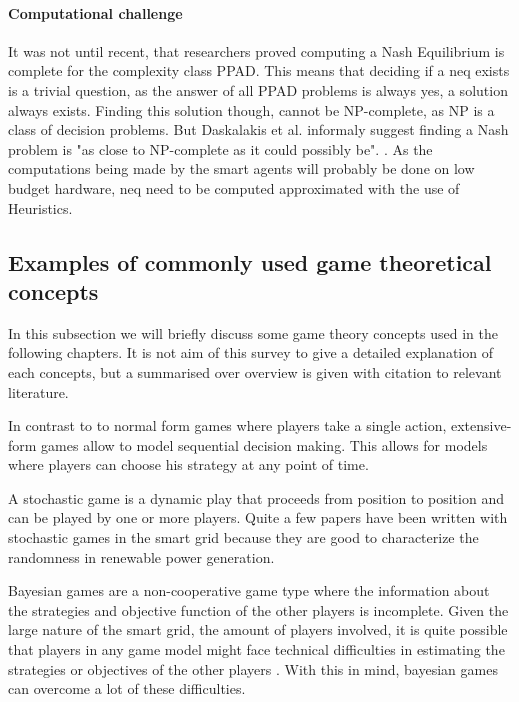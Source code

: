 \paragraph{Computational challenge} 
It was not until recent, that researchers proved computing a Nash Equilibrium is complete for the complexity class PPAD\cite{daskalakis2009complexity}. This means that deciding if a \ac{neq} exists is a trivial question, as the answer of all PPAD problems is always yes, a solution always exists. Finding this solution though, cannot be NP-complete, as NP is a class of decision problems. But Daskalakis et al. informaly suggest finding a Nash problem is "as close to NP-complete as it could possibly be". \cite{daskalakis2009complexity, Aaronson2012}. 
As the computations being made by the smart agents will probably be done on low budget hardware, \ac{neq} need to be computed approximated with the use of Heuristics. \cite{MicrogridModellingPetrosAristidou,AumannGameTheoryAccomplish} 

\subsection{Examples of commonly used game theoretical concepts}
In this subsection we will briefly discuss some game theory concepts used in the following chapters. It is not aim of this survey to give a detailed explanation of each concepts, but a summarised over overview is given with citation to relevant literature.

In contrast to to normal form games where players take a single action, extensive-form games allow to model sequential decision making. This allows for models where players can choose his strategy at any point of time. 

A stochastic game is a dynamic play that proceeds from position to position \cite{Shapley1953} and can be played by one or more players. Quite a few papers have been written with stochastic games in the smart grid \cite{LiangZhuang2014} because they are good to characterize the randomness in renewable power generation.  

Bayesian games are a non-cooperative game type where the information about the strategies and objective function of the other players is incomplete. Given the large nature of the smart grid, the amount of players involved, it is quite possible that players in any game model might face technical difficulties in estimating the strategies or objectives of the other players \cite{keypaper}. With this in mind, bayesian games can overcome a lot of these difficulties.

